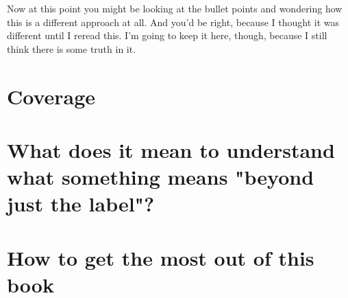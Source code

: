 \documentclass[../OpenAppliedMusicTheory.tex]{subfiles}
\begin{document}
    Now at this point you might be looking at the bullet points and wondering how this is a different approach at all. And you'd be right, because I thought it was different until I reread this. I'm going to keep it here, though, because I still think there is some truth in it. %

    \section*{Coverage}

    \section*{What does it mean to understand what something means "beyond just the label"?}

    \section*{How to get the most out of this book}
\end{document}
